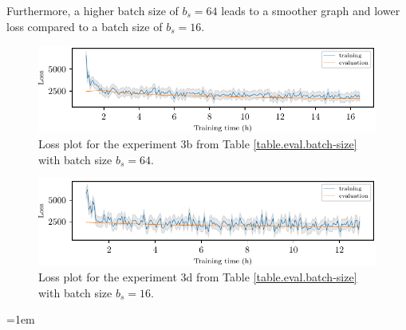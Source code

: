\begin{appendices}
	Furthermore, a higher batch size of $b_s=64$ leads to a smoother graph and lower loss compared to a batch size of $b_s=16$.

	\begin{figure}[H]
		\centering
		\includegraphics{figure/loss_plots/loss_plot_3b.pdf}
		\caption{Loss plot for the experiment 3b from Table \ref{table.eval.batch-size} with batch size $b_s=64$.}
		\label{fig.loss-plot.3b}
	\end{figure}

	\begin{figure}[H]
		\centering
		\includegraphics{figure/loss_plots/loss_plot_3d.pdf}
		\caption{Loss plot for the experiment 3d from Table \ref{table.eval.batch-size} with batch size $b_s=16$.}
		\label{fig.loss-plot.3d}
	\end{figure}
\end{appendices}

\cleardoublepage
{}
\listoffigures

\cleardoublepage
{}
\emergencystretch=1em
\printbibliography[title=References]


